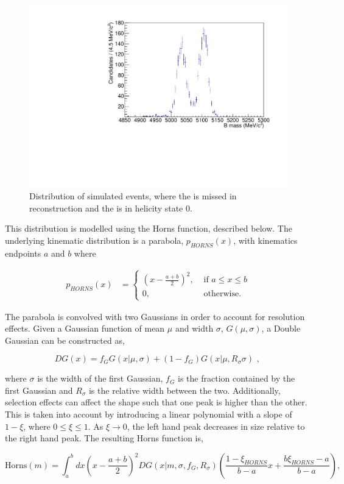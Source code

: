 \begin{figure}[h]
\centering
\includegraphics[width=0.5\linewidth]{figures/fitComponents/horns.pdf}
\caption{Distribution of simulated \decay{\Bm}{(\decay{\Dstarz}{\Dz\piz})\Kstarm} events, where the \piz is missed in reconstruction and the \Dstarz is in helicity state 0.}
\label{fig:horns}
\end{figure}

This distribution is modelled using the Horns function, described below. The underlying kinematic distribution is a parabola, $p_{HORNS}(x)$, with kinematics endpoints $a$ and $b$ where

\begin{align}
p_{HORNS}(x) &= \begin{cases}
\left(x - \frac{a+b}{2}\right)^2, & \text{ if $a \leq x \leq b$}\\ 	
0, & \text{ otherwise.}
\end{cases} 
\end{align}

The parabola is convolved with two Gaussians in order to account for resolution effects. Given a Gaussian function of mean $\mu$ and width $\sigma$, $G(\mu,\sigma)$, a Double Gaussian can be constructed as,

\begin{equation}
DG(x) = f_G G(x|\mu,\sigma) + \left(1-f_G\right) G(x|\mu,R_{\sigma}\sigma) \text{ , }
\end{equation}

where $\sigma$ is the width of the first Gaussian, $f_G$ is the fraction contained by the first Gaussian and $R_{\sigma}$ is the relative width between the two. Additionally, selection effects can affect the shape such that one peak is higher than the other. This is taken into account by introducing a linear polynomial with a slope of $1 - \xi$, where $0 \leq \xi \leq 1$. As $\xi \rightarrow 0$, the left hand peak decreases in size relative to the right hand peak. The resulting Horns function is,

\begin{equation}
\text{Horns}(m) = \int_a^b dx \left(x - \frac{a+b}{2}\right)^2 DG(x|m,\sigma,f_G,R_{\sigma}) \left( \frac{1 - \xi_{HORNS}}{b - a}x + \frac{b\xi_{HORNS} - a}{b - a}\right),
\label{eqn:horns}
\end{equation}

